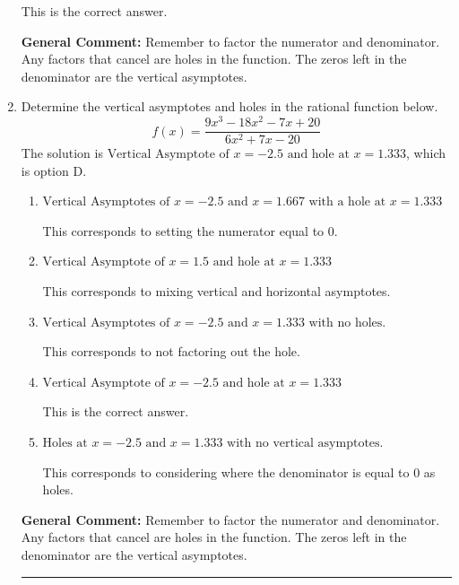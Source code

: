 \documentclass{extbook}[14pt]
\newcommand{\litem}[1]{\item #1

\rule{\textwidth}{0.4pt}}
\begin{document}
\begin{enumerate}
{\begin{enumerate}[label=\Alph*.]
This is the correct answer.
\end{enumerate}

\textbf{General Comment:} Remember to factor the numerator and denominator. Any factors that cancel are holes in the function. The zeros left in the denominator are the vertical asymptotes.
}
\litem{
Determine the vertical asymptotes and holes in the rational function below.
\[ f(x) = \frac{9x^{3} -18 x^{2} -7 x + 20}{6x^{2} +7 x -20} \]The solution is \( \text{Vertical Asymptote of } x = -2.5 \text{ and hole at } x = 1.333 \), which is option D.\begin{enumerate}[label=\Alph*.]
\item \( \text{Vertical Asymptotes of } x = -2.5 \text{ and } x = 1.667 \text{ with a hole at } x = 1.333 \)

This corresponds to setting the numerator equal to 0.
\item \( \text{Vertical Asymptote of } x = 1.5 \text{ and hole at } x = 1.333 \)

This corresponds to mixing vertical and horizontal asymptotes.
\item \( \text{Vertical Asymptotes of } x = -2.5 \text{ and } x = 1.333 \text{ with no holes.} \)

This corresponds to not factoring out the hole.
\item \( \text{Vertical Asymptote of } x = -2.5 \text{ and hole at } x = 1.333 \)

This is the correct answer.
\item \( \text{Holes at } x = -2.5 \text{ and } x = 1.333 \text{ with no vertical asymptotes.} \)

This corresponds to considering where the denominator is equal to 0 as holes.
\end{enumerate}

\textbf{General Comment:} Remember to factor the numerator and denominator. Any factors that cancel are holes in the function. The zeros left in the denominator are the vertical asymptotes.
}
\end{enumerate}
\end{document}
